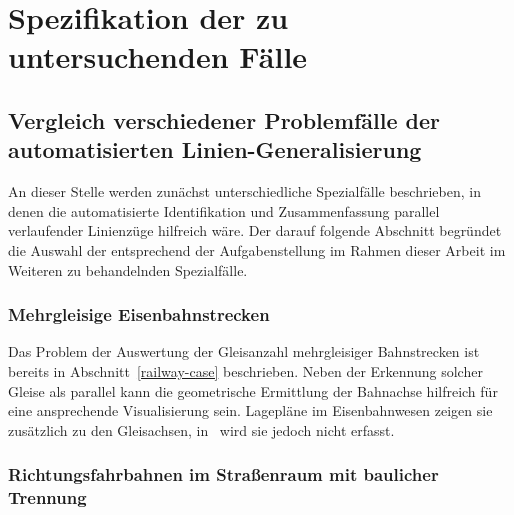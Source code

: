 \documentclass[../main/thesis.tex]{subfiles}
\begin{document}
\chapter{Spezifikation der zu untersuchenden Fälle}




\section{Vergleich verschiedener Problemfälle der automatisierten Linien-Ge\-ne\-ra\-li\-sie\-rung}
\label{ch:case-comparison}


An dieser Stelle werden zunächst unterschiedliche Spezialfälle beschrieben, in denen die automatisierte Identifikation und Zusammenfassung parallel verlaufender Linienzüge hilfreich wäre.
Der darauf folgende Abschnitt begründet die Auswahl der entsprechend der Aufgabenstellung im Rahmen dieser Arbeit im Weiteren zu behandelnden Spezialfälle.


\subsection{Mehrgleisige Eisenbahnstrecken}

Das Problem der Auswertung der Gleisanzahl mehrgleisiger Bahnstrecken ist bereits in Abschnitt~\ref{railway-case} beschrieben.
Neben der Erkennung solcher Gleise als parallel kann die geometrische Ermittlung der Bahnachse hilfreich für eine ansprechende Visualisierung sein.
Lagepläne im Eisenbahnwesen zeigen sie zusätzlich zu den Gleisachsen, in \osm\ wird sie jedoch nicht erfasst.



\subsection{Richtungsfahrbahnen im Straßenraum mit baulicher Trennung}
\label{ch:dual-highway-case-desc}
\end{document}
